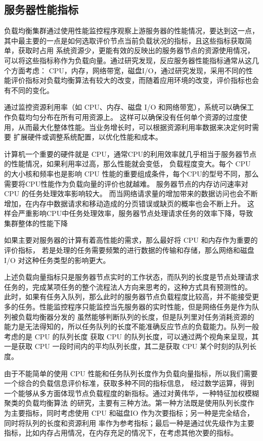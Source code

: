 \subsection{服务器性能指标}

负载均衡集群通过使用性能监控程序观察上游服务器的性能情况，要达到这一点，其中最主要的一点是如何选取评价节点当前负载状况的指标，且这些指标获取简单，获取时占用
系统资源少，更能有效的反映出的服务器节点的资源使用情况，可以将这些指标称作为负载向量。通过研究发现，反应服务器性能指标通常从这几个方面考虑：
CPU，内存，网络带宽，磁盘I/O，通过研究发现，采用不同的性能评价指标对负载均衡算法有较大的改变，而随着应用环境的改变，评价指标也会有不同的变化。

通过监控资源利用率（如 CPU、内存、磁盘 I/O 和网络带宽），系统可以确保工作负载均匀分布在所有可用资源上。
这样可以确保没有任何单个资源的过度使用，从而最大化整体性能。当业务增长时，可以根据资源利用率数据来决定何时需要
扩展硬件或调整系统配置，以优化性能和成本。

计算机一个重要的硬件就是 CPU，通常CPU的利用效率就几乎相当于服务器节点的性能情况，如果利用率过高，那么性能就会变低，
负载程度变大。每个 CPU 的大小核和频率也是影响 CPU 性能的重要组成条件，每个CPU的型号不同，那么需要将CPU性能作为负载向量的评价也就越难。
服务器节点的内存访问速率对 CPU 的任务处理效率影响较大。
而当网络请求量的增加带来的数据访问也会不断增加，在内存中数据请求和移动造成的分页错误或缺页的概率也会不断上升。
这样会严重影响CPU中任务处理效率，服务器节点处理请求任务的效率下降，导致集群整体的性能下降

如果主要对服务器的计算有着高性能的需求，那么最好将 CPU 和内存作为重要的评价指标，
若是处理的任务需要频繁的进行数据的传输和存储，那么网络和磁盘 I/O 对这种任务类型的影响更大。

上述负载向量指标只是服务器节点实时的工作状态\cite{mahato2017scheduling}，而队列的长度是节点处理请求任务的，完成某项任务的整个流程法人方向来思考的，这种方式具有预测性的。
此时，如果有任务入队列，那么此时的服务器节点负载程度比较高，并不能接受更多的任务。性能监控程序只能监控当先服务器的实时性能，但是网络任务是作为队列被负载均衡器分发的
虽然能够判断队列的长度，但是队列里对任务消耗资源的能力是无法得知的，所以任务队列的长度不能准确反应节点的负载能力。队列一般考虑的是 CPU 的队列长度
获取 CPU 的队列长度，可以通过两个视角来呈现，其一是获取 CPU 一段时间内的平均队列长度，其二是获取 CPU 某个时刻的队列长度。

由于不能简单的使用 CPU 性能和任务队列长度作为负载向量指标，所以我们需要一个综合的负载信息评价标准，获取多种不同的指标信息，
经过数学运算，得到一个能够从多方面体现节点负载程度的新指标。通过对黄伟华，一种特征加权模糊聚类的负载均衡算法\cite{黄伟华2017一种特征加权模糊聚类的负载均衡算法}
 的研究，主要有三种方法。第一种方法既是使用队列长度作为主要指标，同时考虑使用 CPU 和磁盘IO 作为次要指标；另一种是完全结合，同时将队列的长度和资源利用
率作为参考指标；最后一种是通过优先级作为主要指标，比如内存占用情况，在内存充足的情况下，在考虑其他次要的指标。

